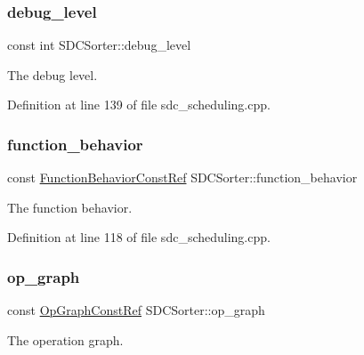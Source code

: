 \subsubsection{\texorpdfstring{debug\+\_\+level}{debug\_level}}
{\footnotesize\ttfamily const int S\+D\+C\+Sorter\+::debug\+\_\+level\hspace{0.3cm}{\ttfamily [private]}}



The debug level. 



Definition at line 139 of file sdc\+\_\+scheduling.\+cpp.

\mbox{\label{classSDCSorter_ae144eaf07200860641d0f31cf55e7304}} 
\subsubsection{\texorpdfstring{function\+\_\+behavior}{function\_behavior}}
{\footnotesize\ttfamily const \hyperlink{function__behavior_8hpp_a94872da12ed056b6ecf90456164e0213}{Function\+Behavior\+Const\+Ref} S\+D\+C\+Sorter\+::function\+\_\+behavior\hspace{0.3cm}{\ttfamily [private]}}



The function behavior. 



Definition at line 118 of file sdc\+\_\+scheduling.\+cpp.

\mbox{\label{classSDCSorter_ae39d5d1c82f5335025d9facccabc4020}} 
\subsubsection{\texorpdfstring{op\+\_\+graph}{op\_graph}}
{\footnotesize\ttfamily const \hyperlink{op__graph_8hpp_a9a0b240622c47584bee6951a6f5de746}{Op\+Graph\+Const\+Ref} S\+D\+C\+Sorter\+::op\+\_\+graph\hspace{0.3cm}{\ttfamily [private]}}



The operation graph. 



